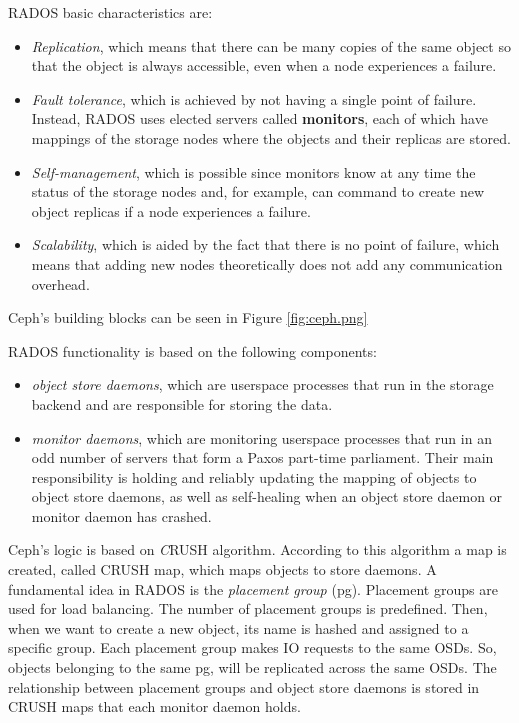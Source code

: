 RADOS basic characteristics are:
\begin{itemize}
\item \textit{Replication}, which means that there can be many copies
of the same object so that the object is always accessible,
even when a node experiences a failure.
\item \textit{Fault tolerance}, which is achieved by not having a
single point of failure. Instead, RADOS uses elected servers
called \textbf{monitors}, each of which have mappings of the
storage nodes where the objects and their replicas are stored.
\item \textit{Self-management}, which is possible since monitors know
at any time the status of the storage nodes and, for example,
can command to create new object replicas if a node experiences
a failure.
\item \textit{Scalability}, which is aided by the fact that there is no
point of failure, which means that adding new nodes
theoretically does not add any communication overhead.
\end{itemize}

Ceph's building blocks can be seen in Figure \ref{fig:ceph.png}


RADOS functionality is based on the following components:
\begin{itemize}
    \item \textit{object store daemons}, which are userspace processes that run 
        in the storage backend and are responsible for storing the data.
    \item \textit{monitor daemons}, which are monitoring userspace processes 
        that run in an odd number of servers that form a Paxos part-time 
        parliament\cite{Paxos}. Their main responsibility is holding and 
        reliably updating the mapping of objects to object store daemons, as 
        well as self-healing when an object store daemon or monitor daemon has 
        crashed.
\end{itemize}

Ceph's logic is based on \textit CRUSH algorithm. According to this algorithm a
map is created, called CRUSH map, which maps objects to store daemons. A
fundamental idea in RADOS is the \textit{placement group} (pg). Placement groups
are used for load balancing. The number of placement groups is predefined. Then,
when we want to create a new object, its name is hashed and assigned to a
specific group. Each placement group makes IO requests to the same OSDs. So,
objects belonging to the same pg, will be replicated across the same OSDs. The
relationship between placement groups and object store daemons is stored in
CRUSH maps that each monitor daemon holds.   
  
